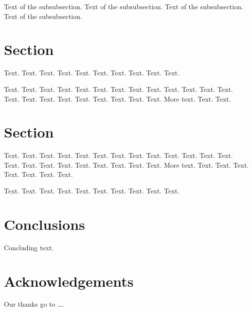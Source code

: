 \documentclass[11pt,a4paper]{article}
\begin{document}
Text of the subsubsection.
Text of the subsubsection.
Text of the subsubsection.
Text of the subsubsection.


\section{Section}

Text. Text. Text. Text. Text.
Text. Text. Text. Text. Text.

Text. Text. Text. Text. Text.
Text. Text. Text. Text. Text.
Text. Text. Text. Text. Text.
Text. Text. Text. Text. Text.
Text. Text. More text. Text. Text.

\section{Section}

Text. Text. Text. Text. Text.
Text. Text. Text. Text. Text.
Text. Text. Text. Text. Text.
Text. Text. Text. Text. Text.
Text. Text. More text. Text. Text.
Text. Text. Text. Text. Text.

Text. Text. Text. Text. Text.
Text. Text. Text. Text. Text.

\section{Conclusions}

Concluding text.

\section{Acknowledgements}

Our thanks go to \ldots .



\end{document}
